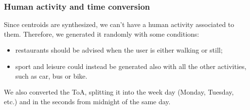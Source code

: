 \documentclass[../../main]{subfiles}
\begin{document}
\subsubsection{Human activity and time conversion}
\label{sss:human-activity-time-conversion}
Since centroids are synthesized, we can't have a human activity associated to them.
Therefore, we generated it randomly with some conditions:
\begin{itemize}
    \item restaurants should be advised when the user is either walking or still;
    \item sport and leisure could instead be generated also with all the other activities, such as car, bus or bike.
\end{itemize}
We also converted the ToA, splitting it into the week day (Monday, Tuesday, etc.) and in the seconds from midnight of the same day.
\end{document}
